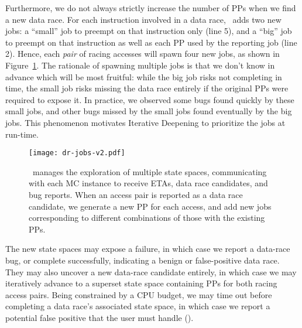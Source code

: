 Furthermore, we do not always strictly increase the number of PPs when we find a new data race.
For each instruction involved in a data race, \quicksand~adds two new jobs:
a ``small'' job to preempt on that instruction only (line 5),
and a ``big'' job to preempt on that instruction as well as each PP used by the reporting job (line 2).
%
Hence,
each {\em pair} of racing accesses will spawn four new jobs, as shown in Figure~\ref{fig:new-dr-jobs}.
%
The rationale of spawning multiple jobs is that we don't know in advance which will be most fruitful: %
while the big job risks not completing in time,
the small job risks missing the data race entirely if the original PPs were required to expose it.
In practice, we observed some bugs found quickly by these small jobs, and other bugs missed by the small jobs found eventually by the big jobs.
This phenomenon motivates Iterative Deepening to prioritize the jobs at run-time.

\begin{figure}[t]
	\texttt{[image: dr-jobs-v2.pdf]}
	\caption{\quicksand~manages the exploration of multiple state spaces, communicating with each MC instance to receive ETAs, data race candidates, and bug reports.
		When an access pair is reported as a data race candidate, we generate a new PP for each access, and add new jobs corresponding to different combinations of those with the existing PPs.}
	\label{fig:new-dr-jobs}
\end{figure}

The new state spaces may expose a failure, in which case we report a data-race bug,
or complete successfully, indicating a benign or false-positive data race.
They may also uncover a new data-race candidate entirely, %
in which case we may iteratively advance to a superset state space containing PPs for both racing access pairs.
Being constrained by a CPU budget,
we may time out before completing a data race's associated state space,
in which case we report a potential false positive that the user must handle (\sect{\ref{sec:future}}).

